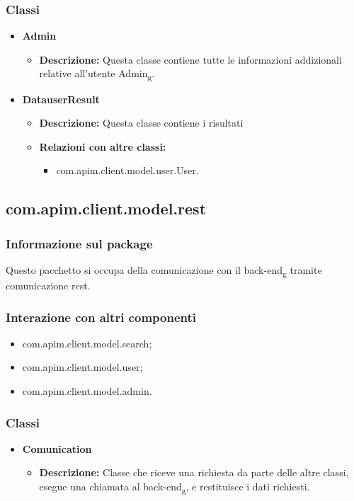 {{			\subsubsection{Classi}{
			\begin{itemize}
				\item \textbf{Admin}
					\begin{itemize}
						\item \textbf{Descrizione:} Questa classe contiene tutte le informazioni addizionali relative all'utente Admin\textsubscript{g}.
					\end{itemize}
				\item \textbf{DatauserResult}
					\begin{itemize}
						\item \textbf{Descrizione:} Questa classe contiene i risultati 
						\item \textbf{Relazioni con altre classi:}
						\begin{itemize}
							\item com.apim.client.model.user.User.
						\end{itemize}
					\end{itemize}
			\end{itemize}
		}
	}
	\subsection{com.apim.client.model.rest}{
		\subsubsection{Informazione sul package}{
			Questo pacchetto si occupa della comunicazione con il back-end\textsubscript{g} tramite comunicazione rest.
		}
		\subsubsection{Interazione con altri componenti}{
			\begin{itemize}
				\item com.apim.client.model.search;
				\item com.apim.client.model.user;
				\item com.apim.client.model.admin.
			\end{itemize}
			\subsubsection{Classi}{
				\begin{itemize}
					\item \textbf{Comunication}
					\begin{itemize}
						\item \textbf{Descrizione:} Classe che riceve una richiesta da parte delle altre classi, esegue una chiamata al back-end\textsubscript{g}, e restituisce i dati richiesti.
					\end{itemize}
				\end{itemize}
			}
		}
	}
}
